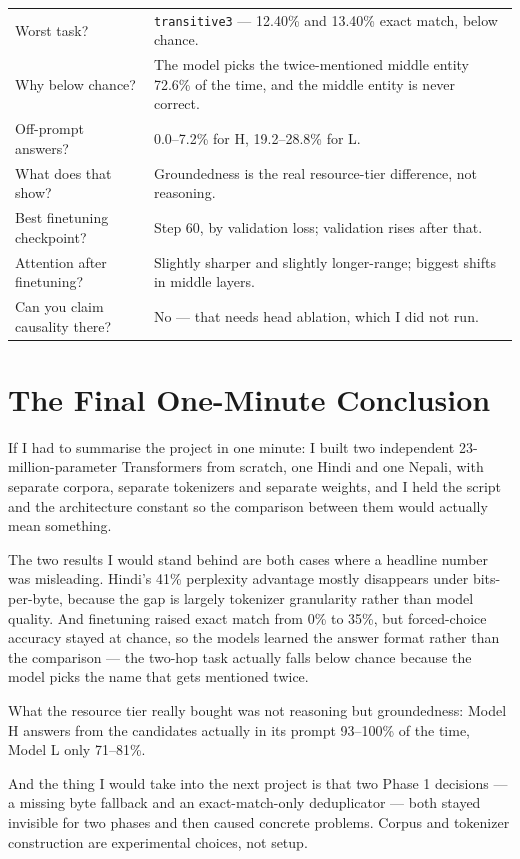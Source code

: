 \documentclass[11pt]{report}
\begin{document}
\begin{longtable}{@{}p{6.6cm}p{8.4cm}@{}}
Worst task? & \texttt{transitive3} --- 12.40\% and 13.40\% exact match, below chance. \\
Why below chance? & The model picks the twice-mentioned middle entity 72.6\% of the time, and the middle entity is never correct. \\
Off-prompt answers? & 0.0--7.2\% for H, 19.2--28.8\% for L. \\
What does that show? & Groundedness is the real resource-tier difference, not reasoning. \\
Best finetuning checkpoint? & Step 60, by validation loss; validation rises after that. \\
Attention after finetuning? & Slightly sharper and slightly longer-range; biggest shifts in middle layers. \\
Can you claim causality there? & No --- that needs head ablation, which I did not run. \\
\bottomrule
\end{longtable}

\chapter{The Final One-Minute Conclusion}

\begin{sayit}
If I had to summarise the project in one minute: I built two independent
23-million-parameter Transformers from scratch, one Hindi and one Nepali, with
separate corpora, separate tokenizers and separate weights, and I held the
script and the architecture constant so the comparison between them would
actually mean something.

\medskip
The two results I would stand behind are both cases where a headline number was
misleading. Hindi's 41\% perplexity advantage mostly disappears under
bits-per-byte, because the gap is largely tokenizer granularity rather than
model quality. And finetuning raised exact match from 0\% to 35\%, but
forced-choice accuracy stayed at chance, so the models learned the answer format
rather than the comparison --- the two-hop task actually falls below chance
because the model picks the name that gets mentioned twice.

\medskip
What the resource tier really bought was not reasoning but groundedness: Model H
answers from the candidates actually in its prompt 93--100\% of the time, Model
L only 71--81\%.

\medskip
And the thing I would take into the next project is that two Phase 1 decisions
--- a missing byte fallback and an exact-match-only deduplicator --- both stayed
invisible for two phases and then caused concrete problems. Corpus and tokenizer
construction are experimental choices, not setup.
\end{sayit}
\end{document}
